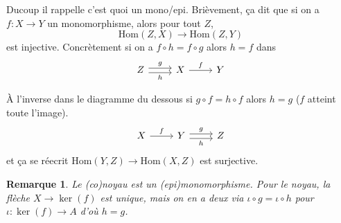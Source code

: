 \documentclass[a4paper,12pt]{book}
\newcommand{\Hom}{\textrm{Hom}}
\theoremstyle{plain}
\newtheorem{rem}{Remarque}
\theoremstyle{definition}
\theoremstyle{remark}
\begin{document}
Ducoup il rappelle c'est quoi un mono/epi. Brièvement, ça dit que
si on a $f\colon X\to Y$ un monomorphisme, alors pour tout $Z$, 
\[\Hom(Z,X)\to \Hom(Z,Y)\]
est injective. Concrètement si on a $f\circ h=f\circ g$ alors $h=f$
dans
\[\begin{tikzcd}
	Z & X & Y
	\arrow["g", shift left, from=1-1, to=1-2]
	\arrow["h"', shift right, from=1-1, to=1-2]
	\arrow["f", from=1-2, to=1-3]
\end{tikzcd}\]

À l'inverse dans le diagramme du dessous si $g\circ f=h\circ f$
alors $h=g$ ($f$ atteint toute l'image).
\[\begin{tikzcd}
	X & Y & Z
	\arrow["g", shift left, from=1-2, to=1-3]
	\arrow["h"', shift right, from=1-2, to=1-3]
	\arrow["f", from=1-1, to=1-2]
\end{tikzcd}\]
et ça se réecrit $\Hom(Y,Z)\to \Hom(X,Z)$ est surjective.

\begin{rem}
    Le (co)noyau est un (epi)monomorphisme. Pour le noyau, la flèche
    $X\to \ker(f)$ est unique, mais on en a deux via 
    $\iota\circ g=\iota\circ h$ pour $\iota\colon \ker(f)\to A$
    d'où $h=g$.
\end{rem}
\end{document}
